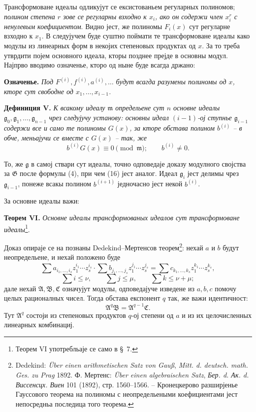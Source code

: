\documentclass[11pt]{article}
\providecommand{\Amod}{\mathfrak A}
\providecommand{\Bmod}{\mathfrak B}
\providecommand{\Gmod}{\mathfrak G}
\providecommand{\mideal}{\mathfrak m}
\providecommand{\gideal}{\mathfrak g}
\providecommand{\zero}[1]{\equiv 0\pmod{#1}}
\begin{document}
Трансформоване идеалы одликујут се ексистованьем регуларных полиномов; {\itshape полином степена $r$ зове се регуларны взходно к $x_i$, ако он содержи член $x_i^r$ с ненулевым коефициентом}. Видно јест, же полиномы $F_i(x)$ сут регуларне взходно к $x_1$. В следујучем буде суштно поймати те трансформоване идеалы како модулы из линеарных форм в некојих степеновых продуктах од $x$. За то треба утврдити појем основного идеала, кторы позднее прејде в основны модул. Најпрво вводимо означенье, кторо од ныне буде всагда држано:

\medskip
\noindent\textbf{Означенье.} {\itshape Под $F^{(i)},f^{(i)},a^{(i)},\ldots$ будут всагда разумены полиномы од $x$, кторе сут свободне од $x_1,\ldots,x_{i-1}$.}

\medskip
\noindent\textbf{Дефиниция V.} {\itshape К всакому идеалу $\mideal$ определьене сут $n$ основне идеалы $\gideal_0,\gideal_1,\ldots,\gideal_{n-1}$ чрез следујучу установу: основны идеал $(i-1)$-ој ступнье $\gideal_{i-1}$ содержи все и само те полиномы $G(x)$, за кторе обстава полином $b^{(i)}$ -- в обче, меньајучи се вместе с $G(x)$ -- так, же}
\begin{equation}
 b^{(i)}G(x)\zero{\mideal};\qquad b^{(i)}\ne0.
\tag{16}
\end{equation}

То, же $\gideal$ в самој ствари сут идеалы, точно одповедаје доказу модулного својства за $\Gmod$ после формулы (4), при чем (16) јест аналог. Идеал $\gideal_i$ јест делимы чрез $\gideal_{i-1}$, понеже всакы полином $b^{(i+1)}$ једночасно јест некой $b^{(i)}$.

За основне идеалы важи:

\medskip
\noindent\textbf{Теорем VI.} {\itshape Основне идеалы трансформованых идеалов сут трансформоване идеалы}\footnote{Теорем VI употребльаје се само в §~7.}.

Доказ опираје се на познаны Dedekind--Мертенсов теорем\footnote{Dedekind: \emph{Über einen arithmetischen Satz von Gauß}, \emph{Mitt. d. deutsch. math. Ges. zu Prag} 1892. Ф. Мертенс: \emph{Über einen algebraischen Satz}, \emph{Бер. d. Ак. d. Виссенсцх. Виен} 101 (1892), стр. 1560--1566. -- Кронецкерово разширјенье Гауссового теорема на полиномы с неопредельеными коефициентами јест непосредньа последица того теорема.}: нехай $a$ и $b$ будут неопредельене, и нехай положено буде
\[
 \sum a_{i_1,\ldots,i_s}z_1^{i_1}\cdots z_s^{i_s}\cdot
 \sum b_{j_1,\ldots,j_s}z_1^{j_1}\cdots z_s^{j_s}
 =
 \sum c_{k_1,\ldots,k_s}z_1^{k_1}\cdots z_s^{k_s},
\]
\[
 \sum i\le \nu,
 \qquad
 \sum j\le \mu,
 \qquad
 \sum k\le \nu+\mu;
\]
дале нехай $\Amod,\Bmod,\mathfrak C$ означујут модулы, одповедајуче изведене из $a,b,c$ помочу целых рационалных чисел. Тогда обстава експонент $q$ так, же важи идентичност:
\begin{equation}
 \Amod^q\Bmod=\Amod^{q-1}\mathfrak C.
\tag{17}
\end{equation}
Тут $\Amod^q$ состоји из степеновых продуктов $q$-ој степени од $a$ и из их целочисленных линеарных комбинациј.
\end{document}
